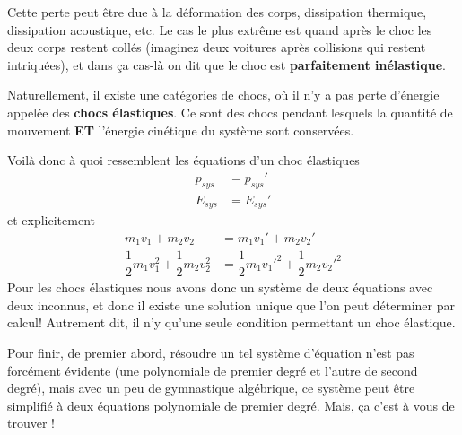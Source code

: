 \documentclass[11pt,a4paper]{article}
\begin{document}
Cette perte peut être due à la déformation des corps, dissipation thermique, dissipation acoustique, etc. Le cas le plus extrême est quand après le choc les deux corps restent collés (imaginez deux voitures après collisions qui restent intriquées), et dans ça cas-là on dit que le choc est \textbf{parfaitement inélastique}. 

Naturellement, il existe une catégories de chocs, où il n'y a pas perte d'énergie appelée des \textbf{chocs élastiques}. Ce sont des chocs pendant lesquels la quantité de mouvement \textbf{ET} l'énergie cinétique du système sont conservées. 

Voilà donc à quoi ressemblent les équations d'un choc élastiques 
\begin{align*}
    p_{sys} &= p_{sys}' \\
    E_{sys} &= E_{sys}' 
\end{align*}
et explicitement 
\begin{align*}
    m_1v_1 + m_2v_2 &= m_1v_1' + m_2v_2'\\
    \dfrac{1}{2}m_1v_1^2 + \dfrac{1}{2}m_2v_2^2  &= \dfrac{1}{2}m_1{v_1'}^2 + \dfrac{1}{2}m_2{v_2'}^2 
\end{align*}
Pour les chocs élastiques nous avons donc un système de deux équations avec deux inconnus, et donc il existe une solution unique que l'on peut déterminer par calcul! Autrement dit, il n'y qu'une seule condition permettant un choc élastique. 

Pour finir, de premier abord, résoudre un tel système d'équation n'est pas forcément évidente (une polynomiale de premier degré et l'autre de second degré), mais avec un peu de gymnastique algébrique, ce système peut être simplifié à deux équations polynomiale de premier degré. Mais, ça c'est à vous de trouver ! 
\newpage
\end{document}
